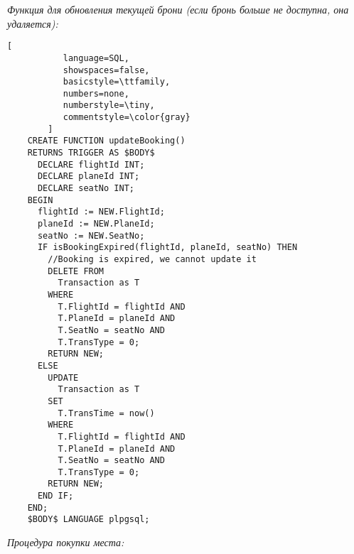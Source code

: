\documentclass[11pt,a4paper,oneside]{article}
\begin{document}
\textit{Функция для обновления текущей брони (если бронь больше не доступна, она удаляется):}

\begin{lstlisting}[
           language=SQL,
           showspaces=false,
           basicstyle=\ttfamily,
           numbers=none,
           numberstyle=\tiny,
           commentstyle=\color{gray}
        ]
    CREATE FUNCTION updateBooking()
    RETURNS TRIGGER AS $BODY$
      DECLARE flightId INT;
      DECLARE planeId INT;
      DECLARE seatNo INT;
    BEGIN
      flightId := NEW.FlightId;
      planeId := NEW.PlaneId;
      seatNo := NEW.SeatNo;
      IF isBookingExpired(flightId, planeId, seatNo) THEN
        //Booking is expired, we cannot update it
        DELETE FROM
          Transaction as T
        WHERE
          T.FlightId = flightId AND
          T.PlaneId = planeId AND
          T.SeatNo = seatNo AND
          T.TransType = 0;
        RETURN NEW;
      ELSE
        UPDATE
          Transaction as T
        SET 
          T.TransTime = now()
        WHERE
          T.FlightId = flightId AND
          T.PlaneId = planeId AND
          T.SeatNo = seatNo AND
          T.TransType = 0;
        RETURN NEW;
      END IF;
    END;
    $BODY$ LANGUAGE plpgsql;
\end{lstlisting}

\textit{Процедура покупки места:}
\end{document}
